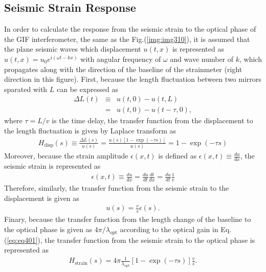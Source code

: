 \subsection{Seismic Strain Response}
In order to calculate the response from the seismic strain to the optical phase of the GIF interferometer, the same as the Fig.(\ref{img:img310}), it is assumed that the plane seismic waves which displacement $u(t,x)$ is represented as $u(t,x)=u_0e^{i(\omega{t}-kx)}$ with angular frequency of $\omega$ and wave number of $k$, which propagates along with the direction of the baseline of the strainmeter (right direction in this figure). First, because the length fluctuation between two mirrors sparated with $L$ can be expressed as 
\begin{eqnarray} 
  \Delta{L(t)} &\equiv& u(t,0) - u(t,L) \\
  &=& u(t,0) - u(t-\tau,0), \label{eq:eq403}
\end{eqnarray}
where $\tau=L/v$ is the time delay, the transfer function from the displacement to the length fluctuation is given by Laplace transform as
\begin{eqnarray} \label{eq:eq404}
  H_{\mathrm{disp}}(s) \equiv \frac{\Delta{L(s)}}{u(s)} = \frac{u(s)\left[ 1-\exp(-\tau{s}) \right]}{u(s)} = 1 - \exp(-\tau{s})
\end{eqnarray}
Moreover, because the strain amplitude $\epsilon{(x,t)}$ is defined as $\epsilon{(x,t)}\equiv\frac{du}{dx}$, the seismic strain is represented as 
\begin{eqnarray} 
  \epsilon{(x,t)} \equiv \frac{du}{dx} = \frac{du}{dt} \frac{dt}{dx} =  \frac{du}{dt} \frac{1}{v} \label{eq:eq406}
\end{eqnarray}
Therefore, similarly, the transfer function from the seismic strain to the displacement is given  as
\begin{eqnarray} \label{eq:eq407}
  u(s) = \frac{v}{s} \epsilon(s).
\end{eqnarray}
Finary, because the transfer function from the length change of the baseline to the optical phase is given as $4\pi/{\lambda_{\mathrm{opt}}}$ according to the optical gain in Eq.(\ref{eq:eq401}), the transfer function from the seismic strain to the optical phase is represented as 
\begin{eqnarray} \label{eq:eq407}
  H_{\mathrm{strain}}(s) = 4\pi\frac{1}{\lambda_{\mathrm{opt}}} \left[1 - \exp(-\tau{s}) \right]\frac{v}{s}.
\end{eqnarray}

